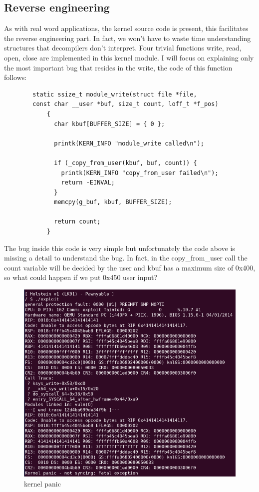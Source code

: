     \subsection{Reverse engineering}
    As with real word applications, the kernel source code is present, this facilitates the reverse engineering part.\newline
    In fact, we won't have to waste time understanding structures that decompilers don't interpret.\newline
    Four trivial functions write, read, open, close are implemented in this kernel module.\newline
    I will focus on explaining only the most important bug that resides in the write, the code of this function follows:\newline
    \begin{verbatim}
        static ssize_t module_write(struct file *file,
        const char __user *buf, size_t count, loff_t *f_pos)
            {
              char kbuf[BUFFER_SIZE] = { 0 };
            
              printk(KERN_INFO "module_write called\n");
            
              if (_copy_from_user(kbuf, buf, count)) {
                printk(KERN_INFO "copy_from_user failed\n");
                return -EINVAL;
              }
              memcpy(g_buf, kbuf, BUFFER_SIZE);
            
              return count;
            }
    \end{verbatim}
    The bug inside this code is very simple but unfortunately the code above is missing a detail to understand the bug.\newline
    In fact, in the copy\_from\_user call the count variable will be decided by the user and kbuf has a maximum size of 0x400, so what could happen if we put 0x450 user input?\newline
    \begin{figure}[htbp]
        \centering
        \includegraphics[width=1\linewidth]{Images/kernel_panic.png}
        \caption{kernel panic}
        \label{fig:enter-label}
    \end{figure}

